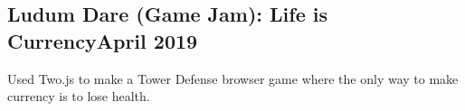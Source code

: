 \documentclass[../Resume.tex]{subfiles}
\begin{document}
	\subsection{Ludum Dare (Game Jam): Life is Currency\null\hfill April 2019}
	\par Used Two.js to make a Tower Defense browser game where the only way to make currency is to lose health.
	\vspace*{-8mm}
\end{document}
